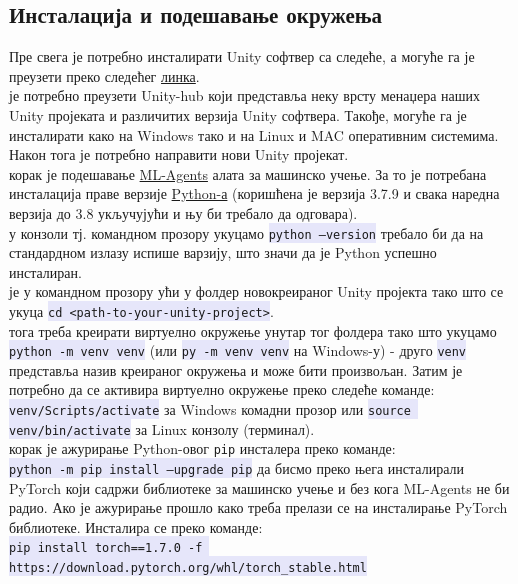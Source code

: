 \documentclass[12pt]{article}
\newcommand{\mycode}[1]{\texttt{\colorbox{Lavender}{#1}}}
\begin{document}
\subsection{Инсталација и подешавање окружења}
Пре свега је потребно инсталирати Unity софтвер са следеће, а могуће га је преузети преко следећег \href{https://unity3d.com/get-unity/download}{линка}. \\
 је потребно преузети Unity-hub који представља неку врсту менаџера наших Unity пројеката и различитих верзија Unity софтвера. Такође, могуће га је инсталирати како на Windows тако и на Linux и MAC оперативним системима.\\
Након тога је потребно направити нови Unity пројекат.
\vspace{0.5cm}\\
 корак је подешавање \href{https://github.com/Unity-Technologies/ml-agents}{ML-Agents} алата за машинско учење. За то је потребана инсталација праве верзије \href{https://www.python.org/downloads/}{Python-а} (коришћена је верзија 3.7.9 и свака наредна верзија до 3.8 укључујући и њу би требало да одговара).\\
 у конзоли тј. командном прозору укуцамо \mycode{python ---version} требало би да на стандардном излазу испише варзију, што значи да је Python успешно инсталиран.\\
 је у командном прозору ући у фолдер новокреираног Unity пројекта тако што се укуца \mycode{cd <path-to-your-unity-project>}.
\vspace{0.5cm}\\
 тога треба креирати виртуелно окружење унутар тог фолдера тако што укуцамо \mycode{python -m venv venv} (или \mycode{py -m venv venv} на Windows-у) - друго \mycode{venv} представља назив креираног окружења и може бити произвољан. Затим је потребно да се активира виртуелно окружење преко следеће команде: \mycode{venv/Scripts/activate} за Windows комадни прозор или \mycode{source venv/bin/activate} за Linux конзолу (терминал).
\vspace{0.5cm}\\
 корак је ажурирање Python-овог \texttt{pip} инсталера преко команде:\\ \mycode{python -m pip install ---upgrade pip} да бисмо преко њега инсталирали PyTorch који садржи библиотеке за машинско учење и без кога ML-Agents не би радио. Ако је ажурирање прошло како треба прелази се на инсталирање PyTorch библиотеке. Инсталира се преко команде:\\ \mycode{pip install torch==1.7.0 -f https://download.pytorch.org/whl/torch\_stable.html}
\end{document}
